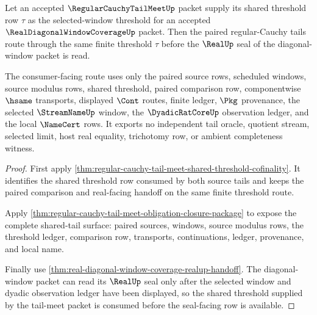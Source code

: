 \begin{theorem}
\label{thm:regular-cauchy-tail-meet-diagonal-window-threshold-handoff}
Let an accepted $\RegularCauchyTailMeetUp$ packet supply its shared threshold row $\tau$ as the selected-window threshold for an accepted $\RealDiagonalWindowCoverageUp$ packet. Then the paired regular-Cauchy tails route through the same finite threshold $\tau$ before the $\RealUp$ seal of the diagonal-window packet is read.

The consumer-facing route uses only the paired source rows, scheduled windows, source modulus rows, shared threshold, paired comparison row, componentwise $\hsame$ transports, displayed $\Cont$ routes, finite ledger, $\Pkg$ provenance, the selected $\StreamNameUp$ window, the $\DyadicRatCoreUp$ observation ledger, and the local $\NameCert$ rows. It exports no independent tail oracle, quotient stream, selected limit, host real equality, trichotomy row, or ambient completeness witness.
\end{theorem}
\begin{proof}
First apply \autoref{thm:regular-cauchy-tail-meet-shared-threshold-cofinality}. It identifies the shared threshold row consumed by both source tails and keeps the paired comparison and real-facing handoff on the same finite threshold route.

Apply \autoref{thm:regular-cauchy-tail-meet-obligation-closure-package} to expose the complete shared-tail surface: paired sources, windows, source modulus rows, the threshold ledger, comparison row, transports, continuations, ledger, provenance, and local name.

Finally use \autoref{thm:real-diagonal-window-coverage-realup-handoff}. The diagonal-window packet can read its $\RealUp$ seal only after the selected window and dyadic observation ledger have been displayed, so the shared threshold supplied by the tail-meet packet is consumed before the seal-facing row is available.
\end{proof}

